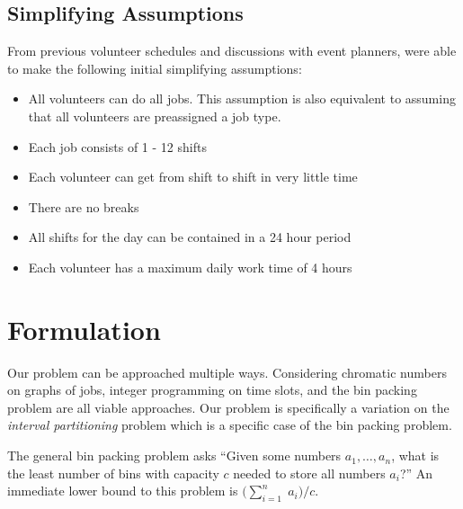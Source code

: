 \documentclass[11pt]{article}
\theoremstyle{definition}
\begin{document}
\begin{multicols}{2}
\subsection{Simplifying Assumptions}
From previous volunteer schedules and discussions with event planners, were able to make the following initial simplifying assumptions:
\begin{itemize}\itemsep0pt
\item All volunteers can do all jobs. This assumption is also equivalent to assuming that all volunteers are preassigned a job type.
\item Each job consists of 1 - 12 shifts
\item Each volunteer can get from shift to shift in very little time
\item There are no breaks
\item All shifts for the day can be contained in a 24 hour period
\item Each volunteer has a maximum daily work time of 4 hours
\end{itemize}
%
%
\section{Formulation}
Our problem can be approached multiple ways.
Considering chromatic numbers on graphs of jobs, integer programming on time slots, and the bin packing problem are all viable approaches.
Our problem is specifically a variation on the \textit{interval partitioning} problem which is a specific case of the bin packing problem.

The general bin packing problem asks ``Given some numbers $a_1, \ldots, a_n$, what is the least number of bins with capacity $c$ needed to store all numbers $a_i$?''
An immediate lower bound to this problem is $\big(\sum_{i = 1}^{n}\;a_i\big)/c$.


\end{multicols}
\end{document}
